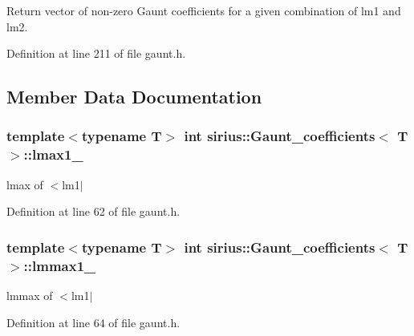 Return vector of non-\/zero Gaunt coefficients for a given combination of lm1 and lm2. 



Definition at line 211 of file gaunt.\+h.



\subsection{Member Data Documentation}
\hypertarget{classsirius_1_1_gaunt__coefficients_a8ddbcceeffa0ce2992080d8a671c023d}{}
\subsubsection[{lmax1\+\_\+}]{\setlength{\rightskip}{0pt plus 5cm}template$<$typename T$>$ int {\bf sirius\+::\+Gaunt\+\_\+coefficients}$<$ T $>$\+::lmax1\+\_\+\hspace{0.3cm}{\ttfamily [private]}}\label{classsirius_1_1_gaunt__coefficients_a8ddbcceeffa0ce2992080d8a671c023d}


lmax of $<$lm1$\vert$ 



Definition at line 62 of file gaunt.\+h.

\hypertarget{classsirius_1_1_gaunt__coefficients_a958c8c57277f3e424c56e2272952fe02}{}
\subsubsection[{lmmax1\+\_\+}]{\setlength{\rightskip}{0pt plus 5cm}template$<$typename T$>$ int {\bf sirius\+::\+Gaunt\+\_\+coefficients}$<$ T $>$\+::lmmax1\+\_\+\hspace{0.3cm}{\ttfamily [private]}}\label{classsirius_1_1_gaunt__coefficients_a958c8c57277f3e424c56e2272952fe02}


lmmax of $<$lm1$\vert$ 



Definition at line 64 of file gaunt.\+h.

\hypertarget{classsirius_1_1_gaunt__coefficients_a9491247cb6d44417403af75a42aac68a}{}
